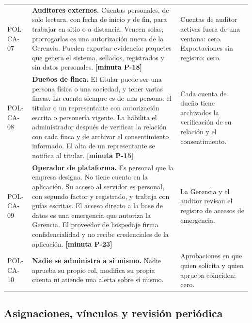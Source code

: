 \documentclass[11pt,letterpaper]{article}
\newcommand{\resp}[1]{\textrm{\footnotesize\bfseries [minuta #1]}}
\begin{document}
{\begin{longtable}{@{}L{1.7cm} L{9.2cm} L{4.8cm}@{}}
POL-CA-07 & \textbf{Auditores externos.} Cuentas personales, de solo lectura, con fecha de inicio y de fin, para trabajar en sitio o a distancia. Vencen solas; prorrogarlas es una autorización nueva de la Gerencia. Pueden exportar evidencia: paquetes que genera el sistema, sellados, registrados y sin datos personales. \resp{P-18} & Cuentas de auditor activas fuera de una ventana: cero. Exportaciones sin registro: cero. \\
POL-CA-08 & \textbf{Dueños de finca.} El titular puede ser una persona física o una sociedad, y tener varias fincas. La cuenta siempre es de una persona: el titular o un representante con autorización escrita o personería vigente. La habilita el administrador después de verificar la relación con cada finca y de archivar el consentimiento informado. El alta de un representante se notifica al titular. \resp{P-15} & Cada cuenta de dueño tiene archivados la verificación de su relación y el consentimiento. \\
POL-CA-09 & \textbf{Operador de plataforma.} Es personal que la empresa designa. No tiene cuenta en la aplicación. Su acceso al servidor es personal, con segundo factor y registrado, y trabaja con guías escritas. El acceso directo a la base de datos es una emergencia que autoriza la Gerencia. El proveedor de hospedaje firma confidencialidad y no recibe credenciales de la aplicación. \resp{P-23} & La Gerencia y el auditor revisan el registro de accesos de emergencia. \\
POL-CA-10 & \textbf{Nadie se administra a sí mismo.} Nadie aprueba su propio rol, modifica su propia cuenta ni atiende una alerta sobre sí mismo. & Aprobaciones en que quien solicita y quien aprueba coinciden: cero. \\
\end{longtable}
}

\subsection{Asignaciones, vínculos y revisión periódica}
\end{document}
